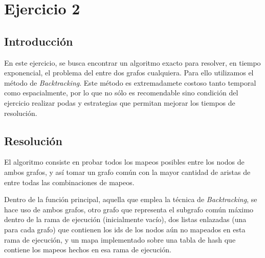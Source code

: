 \section{Ejercicio 2}


\subsection{Introducción}
En este ejercicio, se busca encontrar un algoritmo exacto para resolver, en
tiempo exponencial, el problema del  entre dos grafos cualquiera.
Para ello utilizamos el método de \textit{Backtracking}. Este método es
extremadamete costoso tanto temporal como espacialmente, por lo que no sólo
es recomendable sino condición del ejercicio realizar podas y estrategias que
permitan mejorar los tiempos de resolución.

\subsection{Resolución}
El algoritmo consiste en probar todos los mapeos posibles entre los nodos de
ambos grafos, y así tomar un grafo común con la mayor cantidad de aristas de
entre todas las combinaciones de mapeos.

Dentro de la función principal, aquella que emplea la técnica de
\textit{Backtracking}, se hace uso de ambos grafos, otro grafo que representa
el subgrafo común máximo dentro de la rama de ejecución (inicialmente
vacío), dos listas enlazadas (una para cada grafo) que contienen
los ids de los nodos aún no mapeados en esta rama de ejecución, y un mapa
implementado sobre una tabla de hash que contiene los mapeos hechos en esa
rama de ejecución.

~

